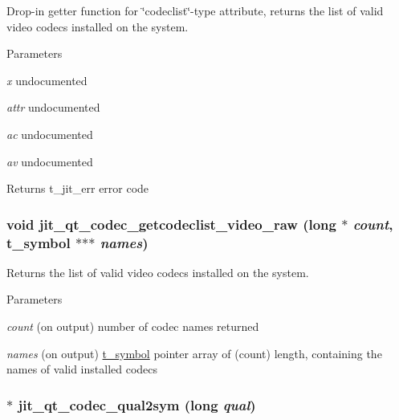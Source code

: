 Drop-\/in getter function for \char`\"{}codeclist\char`\"{}-\/type attribute, returns the list of valid video codecs installed on the system. 
\begin{DoxyParams}{Parameters}
\item[{\em x}]undocumented \item[{\em attr}]undocumented \item[{\em ac}]undocumented \item[{\em av}]undocumented\end{DoxyParams}
\begin{DoxyReturn}{Returns}
t\_\-jit\_\-err error code 
\end{DoxyReturn}
\hypertarget{group__qtcodecmod_gae6661384fe174c791b221987ad3e785f}{
\subsubsection[{jit\_\-qt\_\-codec\_\-getcodeclist\_\-video\_\-raw}]{\setlength{\rightskip}{0pt plus 5cm}void jit\_\-qt\_\-codec\_\-getcodeclist\_\-video\_\-raw (long $\ast$ {\em count}, \/  {\bf t\_\-symbol} $\ast$$\ast$$\ast$ {\em names})}}
\label{group__qtcodecmod_gae6661384fe174c791b221987ad3e785f}


Returns the list of valid video codecs installed on the system. 
\begin{DoxyParams}{Parameters}
\item[{\em count}](on output) number of codec names returned \item[{\em names}](on output) \hyperlink{structt__symbol}{t\_\-symbol} pointer array of (count) length, containing the names of valid installed codecs \end{DoxyParams}
\hypertarget{group__qtcodecmod_ga7e4d6b34f51704dc53f2a9d2cde641b1}{
\subsubsection[{jit\_\-qt\_\-codec\_\-qual2sym}]{$\ast$ jit\_\-qt\_\-codec\_\-qual2sym (long {\em qual})}}
\label{group__qtcodecmod_ga7e4d6b34f51704dc53f2a9d2cde641b1}



